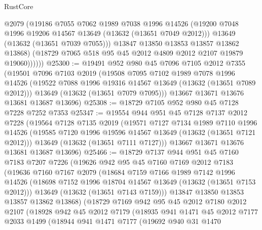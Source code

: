 \begin{lexlean}{RustCore}
\begin{coremodule}
                @2079
                (@19186
                  @7055
                  @7062
                  @1989
                  @7038
                  @1996
                  @14526
                  (@19200 @7048 @1996 @19206 @14567 @13649 (@13632 (@13651 @7049 @2012)))
                  @13649
                  (@13632 (@13651 @7039 @7055)))
                @13847
                @13850
                @13853
                @13857
                @13862
                @13868)
              (@18729 @7065 @518 @95 @45 @2012 @4809 @2012 @2107 @19879 @19060))))))
@25300 := @19491
    @952
    @980
    @45
    @7096
    @7105
    @2012
    @7355
    (@19501
      @7096
      @7103
      @2019
      (@19508
        @7095
        @7102
        @1989
        @7078
        @1996
        @14526
        (@19522 @7088 @1996 @19316 @14567 @13649 (@13632 (@13651 @7089 @2012)))
        @13649
        (@13632 (@13651 @7079 @7095)))
      @13667
      @13671
      @13676
      @13681
      @13687
      @13696)
@25308 := @18729 @7105 @952 @980 @45 @7128 @7228 @7252 @7353
@25347 := @19554
    @944
    @951
    @45
    @7128
    @7137
    @2012
    @7228
    (@19564
      @7128
      @7135
      @2019
      (@19571
        @7127
        @7134
        @1989
        @7110
        @1996
        @14526
        (@19585 @7120 @1996 @19596 @14567 @13649 (@13632 (@13651 @7121 @2012)))
        @13649
        (@13632 (@13651 @7111 @7127)))
      @13667
      @13671
      @13676
      @13681
      @13687
      @13696)
@25466 := @18729
    @7137
    @944
    @951
    @45
    @7160
    @7183
    @7207
    @7226
    (@19626
      @942
      @95
      @45
      @7160
      @7169
      @2012
      @7183
      (@19636
        @7160
        @7167
        @2079
        (@18684
          @7159
          @7166
          @1989
          @7142
          @1996
          @14526
          (@18698 @7152 @1996 @18704 @14567 @13649 (@13632 (@13651 @7153 @2012)))
          @13649
          (@13632 (@13651 @7143 @7159)))
        @13847
        @13850
        @13853
        @13857
        @13862
        @13868)
      (@18729
        @7169
        @942
        @95
        @45
        @2012
        @7180
        @2012
        @2107
        (@18928
          @942
          @45
          @2012
          @7179
          (@18935
            @941
            @1471
            @45
            @2012
            @7177
            @2033
            @1499
            (@18944
              @941
              @1471
              @7177
              (@19692
                @940
                @31
                @1470

\end{coremodule}
\end{lexlean}
